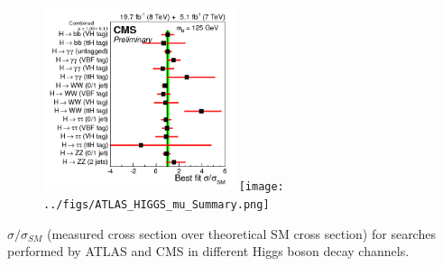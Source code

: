 \begin{frame}{}
\vspace{-.2cm}
\begin{figure}[!Hhtbp]
  \begin{center}
    \includegraphics[width=0.5\textwidth]{../figs/sqr_mlz_ccc_mH125.png}
    \texttt{[image: ../figs/ATLAS\_HIGGS\_mu\_Summary.png]}
  \end{center}
\end{figure}

\vspace{-.2cm}
    \begin{block}{}
      \tiny \centering $\sigma/\sigma_{SM}$ (measured cross section over theoretical SM cross section) for searches performed by ATLAS and CMS in different Higgs boson decay channels.
    \end{block}

\end{frame}

